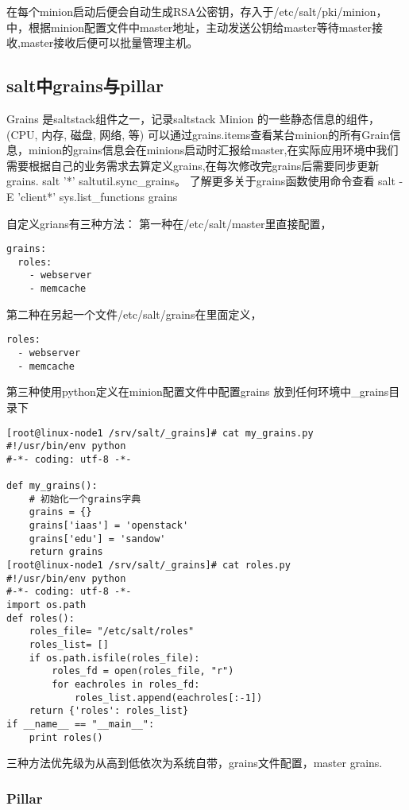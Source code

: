 在每个minion启动后便会自动生成RSA公密钥，存入于/etc/salt/pki/minion，中，根据minion配置文件中master地址，主动发送公钥给master等待master接收,master接收后便可以批量管理主机。

\subsection{salt中grains与pillar}

Grains 是saltstack组件之一，记录saltstack Minion 的一些静态信息的组件，(CPU, 内存, 磁盘, 网络, 等) 可以通过grains.items查看某台minion的所有Grain信息，minion的grains信息会在minions启动时汇报给master,在实际应用环境中我们需要根据自己的业务需求去算定义grains,在每次修改完grains后需要同步更新grains.  salt '*' saltutil.sync_grains。 了解更多关于grains函数使用命令查看 salt -E 'client*' sys.list_functions grains

自定义grians有三种方法： 
第一种在/etc/salt/master里直接配置，

\begin{lstlisting}
grains:
  roles:
    - webserver
    - memcache
\end{lstlisting}

第二种在另起一个文件/etc/salt/grains在里面定义，

\begin{lstlisting}
roles:
  - webserver
  - memcache
\end{lstlisting}

第三种使用python定义在minion配置文件中配置grains 放到任何环境中_grains目录下

\begin{lstlisting}
[root@linux-node1 /srv/salt/_grains]# cat my_grains.py
#!/usr/bin/env python
#-*- coding: utf-8 -*-

def my_grains():
    # 初始化一个grains字典
    grains = {}
    grains['iaas'] = 'openstack'
    grains['edu'] = 'sandow'
    return grains
[root@linux-node1 /srv/salt/_grains]# cat roles.py
#!/usr/bin/env python
#-*- coding: utf-8 -*-
import os.path
def roles():
    roles_file= "/etc/salt/roles"
    roles_list= []
    if os.path.isfile(roles_file):
        roles_fd = open(roles_file, "r")
        for eachroles in roles_fd:
            roles_list.append(eachroles[:-1])
    return {'roles': roles_list}
if __name__ == "__main__":
    print roles()
\end{lstlisting}

三种方法优先级为从高到低依次为系统自带，grains文件配置，master grains. 
\subsubsection{Pillar}

